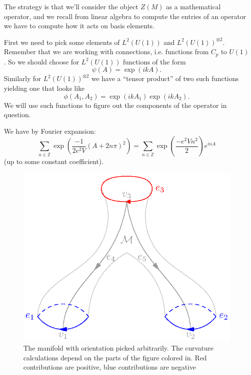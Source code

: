 The strategy is that we'll consider the object $Z(M)$ as a
mathematical operator, and we recall from linear algebra to
compute the entries of an operator we have to compute how it acts
on basis elements. 

First we need to pick some elements of $L^{2}(U(1))$ and
$L^{2}(U(1))^{\otimes 2}$. Remember that we are working
with connections, i.e. functions from $C_{p}$ to $U(1)$. So we
should choose for $L^{2}(U(1))$ functions of the form
\begin{equation}%
\psi(A) = \exp(ikA).
\end{equation}
Similarly for $L^{2}(U(1))^{\otimes 2}$ we have a
``tensor product'' of two such functions yielding one that looks
like
\begin{equation}%
\phi(A_{1},A_{2}) = \exp(ikA_{1})\exp(ikA_{2}).
\end{equation}
We will use such functions to figure out the components of the
operator in question.

\begin{prop}\label{prop:fourierExpansionThetaFunction}
We have by Fourier expansion:
\begin{equation}%
\sum_{n\in\mathbb{Z}}\exp\left(\frac{-1}{2e^{2}V}(A+2n\pi)^{2}\right)
= \sum_{n\in\mathbb{Z}}\exp\left(\frac{-e^{2}Vn^{2}}{2}\right)e^{inA}
\end{equation}
(up to some constant coefficient).
\end{prop}

\begin{figure}[t]
\includegraphics{img/img4.eps}
\caption{The manifold with orientation picked arbitrarily. The
  curvature calculations depend on the parts of the figure
  colored in. Red contributions are positive, blue contributions
  are negative}\label{fig:img4}
\end{figure}

